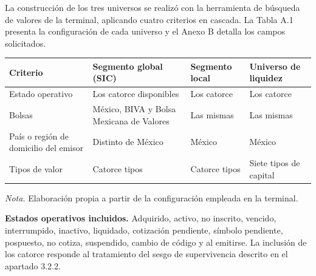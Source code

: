 

La construcción de los tres universos se realizó con la herramienta de búsqueda de valores de la terminal, aplicando cuatro criterios en cascada. La Tabla A.1 presenta la configuración de cada universo y el Anexo B detalla los campos solicitados.


{\small
\begin{longtable}[]{@{}
  >{\raggedright\arraybackslash}p{}
  >{\raggedright\arraybackslash}p{}
  >{\raggedright\arraybackslash}p{}
  >{\raggedright\arraybackslash}p{}@{}}
\toprule\noalign{}
\begin{minipage}[b]{\linewidth}\raggedright
\textbf{Criterio}
\end{minipage} & \begin{minipage}[b]{\linewidth}\raggedright
\textbf{Segmento global (SIC)}
\end{minipage} & \begin{minipage}[b]{\linewidth}\raggedright
\textbf{Segmento local}
\end{minipage} & \begin{minipage}[b]{\linewidth}\raggedright
\textbf{Universo de liquidez}
\end{minipage} \\
\midrule\noalign{}
\endhead
\bottomrule\noalign{}
\endlastfoot
Estado operativo & Los catorce disponibles & Los catorce & Los catorce \\
Bolsas & México, BIVA y Bolsa Mexicana de Valores & Las mismas & Las mismas \\
País o región de domicilio del emisor & Distinto de México & México & México \\
Tipos de valor & Catorce tipos & Catorce tipos & Siete tipos de capital \\
\end{longtable}
}

\emph{Nota.} Elaboración propia a partir de la configuración empleada en la terminal.

\textbf{Estados operativos incluidos.} Adquirido, activo, no inscrito, vencido, interrumpido, inactivo, liquidado, cotización pendiente, símbolo pendiente, pospuesto, no cotiza, suspendido, cambio de código y al emitirse. La inclusión de los catorce responde al tratamiento del sesgo de supervivencia descrito en el apartado 3.2.2.

